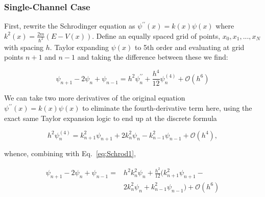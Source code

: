 \documentclass[%
 reprint,
 amsmath,amssymb,
 aps,
 nofootinbib
]{revtex4-1}
\begin{document}
\subsubsection{Single-Channel Case}

First, rewrite the Schrodinger equation as $\psi^{\prime\prime}(x) = k(x) \psi(x)$ where $k^2(x) = \frac{2m}{\hbar^2} (E-V(x))$. Define an equally spaced grid of points, $x_0, x_1,..., x_N$ with spacing $h$. Taylor expanding $\psi(x)$ to 5th order and evaluating at grid points $n+1$ and $n-1$ and taking the difference between these we find:

%

\begin{equation}
\psi_{n+1} - 2 \psi_n + \psi_{n-1} = h^2 \psi_n^{\prime\prime} + \frac{h^4}{12} \psi^{(4)}_n + \mathcal{O}(h^6)
\label{eq:Schrod1}
\end{equation}

\noindent We can take two more derivatives of the original equation  $\psi^{\prime\prime}(x) = k(x) \psi(x)$ to eliminate the fourth-derivative term here, using the exact same Taylor expansion logic to end up at the discrete formula

\begin{equation}
h^2 \psi^{(4)}_n = k^2_{n+1} \psi_{n+1} + 2 k^2_n \psi_n - k^2_{n-1} \psi_{n-1} + \mathcal{O}(h^4), 
\end{equation} 

\noindent whence, combining with Eq.~\ref{eq:Schrod1},

\begin{eqnarray*}
\psi_{n+1}-2\psi_n+\psi_{n-1} =& h^2k^2_n \psi_n + \frac{h^2}{12 } ( k^2_{n+1}\psi_{n+1} - \\ &2 k^2_n \psi_n + k^2_{n-1} \psi_{n-1} ) + \mathcal{O}(h^6)
\end{eqnarray*}
\end{document}
